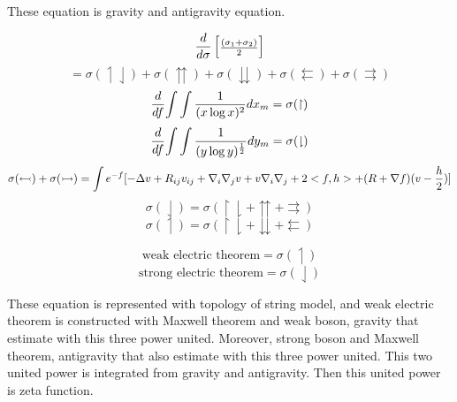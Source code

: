 \documentclass{jsarticle}
\begin{document}
  These equation is gravity and antigravity equation. 

	   $$ {d \over d\sigma}\begin{bmatrix}{(\sigma_1 + \sigma_2) 
	   \over 2}\end{bmatrix}  $$
	   $$ = \sigma(\upharpoonleft \downharpoonleft) + \sigma(
	   \upuparrows)+ \sigma(\downdownarrows)+ 
	   \sigma(\leftleftarrows)
	   + \sigma(\rightrightarrows) $$
	   $$ {d \over df}{\int \int {1 \over (x \log x)^2}}dx_m
	   = \sigma(\upharpoonright) $$
	   $$ {d \over df}{\int \int {1 \over (y \log y)^{1 \over2}}}dy_m
	   = \sigma(\downharpoonright) $$
	   $$ \sigma(\leftarrowtail) + \sigma(\rightarrowtail)
	   = \int e^{-f}[-\Delta v + R_{ij}v_{ij} + \nabla_{i}\nabla_{j}v
	   + v\nabla_{i}\nabla_{j} + 2 <f,h> + (R + \nabla f)(v - 
	   {h \over 2})]
	   $$
	   $$ \sigma(\downharpoonleft) = \sigma(\upharpoonright 
	   \downharpoonright + \upuparrows 
	   + \rightrightarrows)$$
	   $$ \sigma(\upharpoonleft) =  \sigma(\upharpoonright 
	   \downharpoonright + \downdownarrows 
	   + \leftleftarrows) $$
         
	   $$ \text{weak electric theorem} = \sigma(\upharpoonleft) $$
	   $$ \text{strong electric theorem} = \sigma(\downharpoonleft) $$

	   These equation is represented with topology of string model,
	   and weak electric theorem is constructed with Maxwell theorem 
	   and weak boson, gravity that estimate with this three power united.
	   Moreover, strong boson and Maxwell theorem, antigravity that
	   also estimate with this three power united.
	   This two united power is integrated from gravity and antigravity.
	   Then this united power is zeta function.
\end{document}

